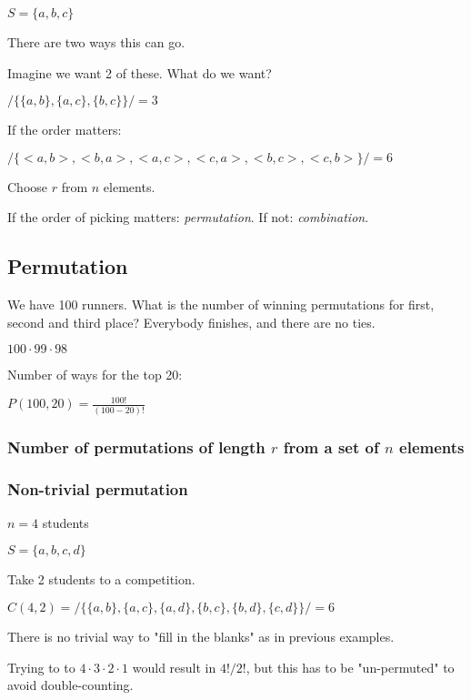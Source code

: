 \documentclass[english,openany]{book}
\begin{document}
    $S = \{a,b,c\}$

    There are two ways this can go.

    Imagine we want 2 of these. What do we want?

    $/ \{ \{a,b\}, \{a,c\}, \{b,c\} \} / = 3$

    If the order matters:

    $/ \{   <a,b>, <b,a>, <a,c>, <c,a>, <b,c>, <c,b>  \} /  = 6$

    Choose $r$ from $n$ elements.

    If the order of picking matters: \textit{permutation}. If not: \textit{combination}.\\

    \subsection{Permutation}

    We have 100 runners. What is the number of winning permutations for first, second and third place? Everybody finishes, and there are no ties.

    $100 \cdot 99 \cdot 98$

    Number of ways for the top 20:

    $P(100,20) = \frac{100!}{(100-20)!}$

    \subsubsection{Number of permutations of length $r$ from a set of $n$ elements}

    \noindent{}

    \subsubsection{Non-trivial permutation}

    $n = 4$ students

    $S = \{a,b,c,d \}$

    Take 2 students to a competition.

    $C(4,2) = / \{ \{a,b\}, \{a,c\}, \{a,d\}, \{b, c\}, \{b,d\}, \{c,d\} \} / = 6$

    There is no trivial way to "fill in the blanks" as in previous examples.

    Trying to to $4 \cdot 3 \cdot 2 \cdot 1$ would result in $4!/2!$, but this has to be "un-permuted" to avoid double-counting.
\end{document}
